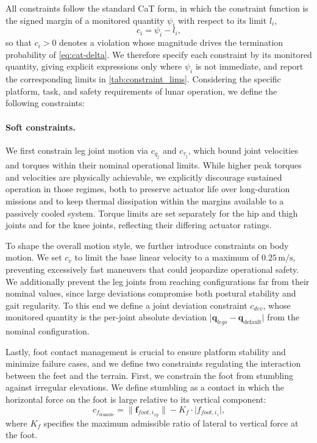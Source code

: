 All constraints follow the standard CaT form, in which the constraint function is the signed margin of a monitored quantity $\psi_i$ with respect to its limit $l_i$,
%
\begin{equation}
    c_i = \psi_i - l_i,
    \label{eq:generic-constraint}
\end{equation}
%
so that $c_i>0$ denotes a violation whose magnitude drives the termination probability of \cref{eq:cat-delta}. We therefore specify each constraint by its monitored quantity, giving explicit expressions only where $\psi_i$ is not immediate, and report the corresponding limits in \cref{tab:constraint_lims}. Considering the specific platform, task, and safety requirements of lunar operation, we define the following constraints:

\paragraph{Soft constraints.} We first constrain leg joint motion via $c_{\dot{q}_j}$ and $c_{\tau_j}$, which bound joint velocities and torques within their nominal operational limits. While higher peak torques and velocities are physically achievable, we explicitly discourage sustained operation in those regimes, both to preserve actuator life over long-duration missions and to keep thermal dissipation within the margins available to a passively cooled system. Torque limits are set separately for the hip and thigh joints and for the knee joints, reflecting their differing actuator ratings.

To shape the overall motion style, we further introduce constraints on body motion. We set $c_{v}$ to limit the base linear velocity to a maximum of $0.25\,\mathrm{m/s}$, preventing excessively fast maneuvers that could jeopardize operational safety. We additionally prevent the leg joints from reaching configurations far from their nominal values, since large deviations compromise both postural stability and gait regularity. To this end we define a joint deviation constraint $c_{dev}$, whose monitored quantity is the per-joint absolute deviation $\lvert \boldsymbol{q}_{legs} - \boldsymbol{q}_{\text{default}} \rvert$ from the nominal configuration.

Lastly, foot contact management is crucial to ensure platform stability and minimize failure cases, and we define two constraints regulating the interaction between the feet and the terrain. First, we constrain the foot from stumbling against irregular elevations. We define stumbling as a contact in which the horizontal force on the foot is large relative to its vertical component:
%
\begin{equation}
    c_{f_{\text{stumble}}} = 
    \lVert \boldsymbol{f}_{foot,i_{xy}} \rVert - K_f \cdot \lvert f_{foot,i_{z}} \rvert,
    \label{eq:stumble}
\end{equation}
%
where $K_f$ specifies the maximum admissible ratio of lateral to vertical force at the foot.

